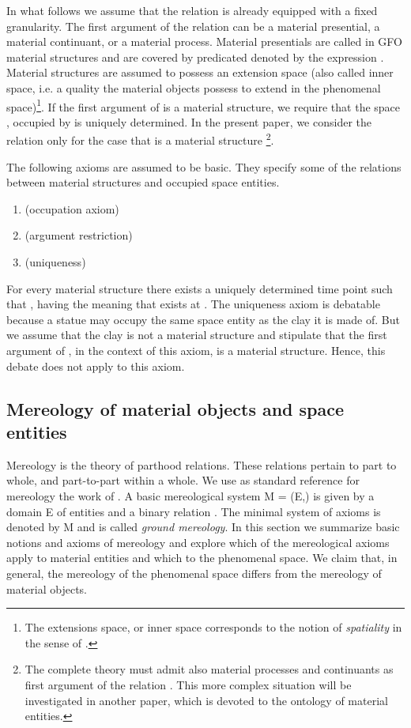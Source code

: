 \documentclass{ao2e}
\begin{document}
{In what follows we assume that the relation  is already equipped with a fixed granularity. 
The first argument of the relation  can be a material presential, a material continuant, or a material process. Material presentials are called in GFO material structures and are covered by predicated denoted by the expression . Material structures are assumed to possess an extension space
(also called inner space, i.e. a quality the material objects possess to extend in the phenomenal space)\footnote{ The extensions space, or inner space corresponds to the notion of {\it spatiality} in the sense of \cite{hartmann-n-1959-a}.}. If the first argument   of  is a material structure, we require that the space , occupied by  is uniquely determined.  In the present paper, we consider the relation  only for the case that  is a material structure \footnote{The complete theory must admit also material processes and continuants as first argument of the relation . This more complex situation will be investigated in another paper, which is devoted to the ontology of material entities.}.

The following axioms are assumed to be basic. They specify some of the relations between material structures and occupied space entities.


\begin{enumerate}
	\item  \hfill{(occupation axiom)}
	\item  \hfill{(argument restriction)}
	\item  \hfill{(uniqueness)}
\end{enumerate}

For every material structure  there exists a uniquely determined time point  such that , having the meaning that  exists at . The uniqueness axiom is debatable because a statue may occupy the same space entity as the clay it is made of. But we assume that the clay is not a material structure and stipulate that the first argument of , in the context of this axiom, is a material structure. Hence, this debate does not apply to this axiom.



\subsection{Mereology of material objects and space entities}           
Mereology is the theory of parthood relations. These relations pertain to part to whole, and part-to-part within a whole. We use as standard reference for mereology the work of \cite{simons-p-1987-a}. A basic mereological system M = (E,) is given by a domain E of entities and a binary relation . The minimal system of axioms is denoted by M and is called \textit{ground mereology}. In this section we summarize basic notions and axioms of mereology and explore which of the mereological axioms apply to material entities and which to the phenomenal space. We claim that, in general, the mereology of the phenomenal space differs from the mereology of material objects. 


}
\end{document}
